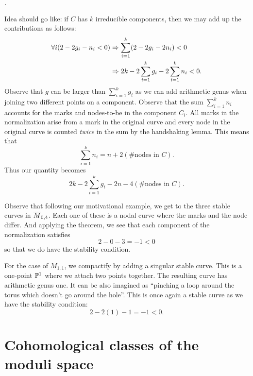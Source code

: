 \documentclass[12pt]{memoir}
\begin{document}
\begin{center}
    .
\end{center}

\begin{ptcb}
    Idea should go like: if $C$ has $k$ irreducible components, then we may add up the contributions as follows:
    \begin{align*}
    \forall i(2-2g_i-n_i<0)&\Rightarrow\sum_{i=1}^k(2-2g_i-2n_i)<0\\
    &\Rightarrow2k-2\sum_{i=1}^k g_i-2\sum_{i=1}^k n_i<0.
    \end{align*}
    Observe that $g$ can be larger than $\sum_{i=1}^k g_i$ as we can add arithmetic genus when joining two different points on a component. Observe that the sum $\sum_{i=1}^k n_i$ accounts for the marks and nodes-to-be in the component $C_i$. All marks in the normalization arise from a mark in the original curve and every node in the original curve is counted \emph{twice} in the sum by the handshaking lemma. This means that 
    $$\sum_{i=1}^k n_i=n+2(\#\text{nodes in }C).$$
    Thus our quantity becomes 
    $$2k-2\sum_{i=1}^kg_i-2n-4(\#\text{nodes in }C).$$
\end{ptcb}
\begin{Ex}
    Observe that following our motivational example, we get to the three stable curves in $\overline M_{0,4}$. Each one of these is a nodal curve where the marks and the node differ. And applying the theorem, we see that each component of the normalization satisfies
    $$2-0-3=-1<0$$
    so that we do have the stability condition. 
\end{Ex}

\begin{Ex}
    For the case of $M_{1,1}$, we compactify by adding a singular stable curve. This is a one-point $\mathbb{P}^1$ where we attach two points together. The resulting curve has arithmetic genus one. It can be also imagined as ``pinching a loop around the torus which doesn't go around the hole''. This is once again a stable curve as we have the stability condition:
    $$2-2(1)-1=-1<0.$$
\end{Ex}

\section{Cohomological classes of the moduli space}
\end{document}
